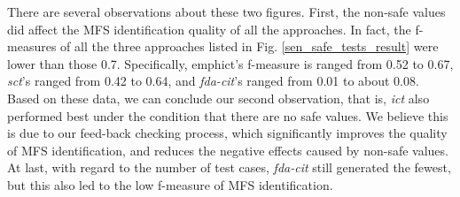 \documentclass[10pt,journal,compsoc]{IEEEtran}
\begin{document}
There are several observations about these two figures. First, the non-safe values did affect the MFS identification quality of all the approaches. In fact, the f-measures of all the three approaches listed in Fig. \ref{sen_safe_tests_result} were lower than those 0.7. Specifically, emph{ict}'s f-measure is ranged from 0.52 to 0.67,  \emph{sct}'s ranged from  0.42 to 0.64, and \emph{fda-cit}'s ranged from 0.01 to about 0.08. Based on these data, we can conclude our second observation, that is, \emph{ict} also performed best under the condition that there are no safe values. We believe this is due to our feed-back checking process, which significantly improves the quality of MFS identification, and reduces the negative effects caused by non-safe values.
At last, with regard to the number of test cases, \emph{fda-cit} still generated the fewest, but this also led to the low f-measure of MFS identification.
\end{document}
